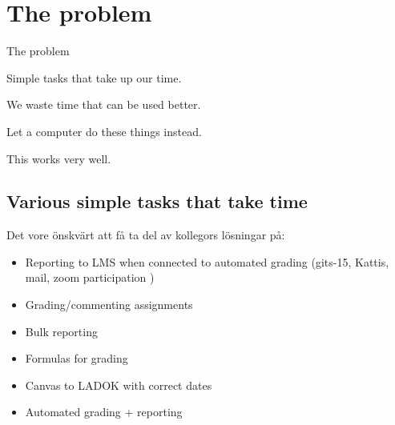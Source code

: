 \mode*

\section{The problem}

\begin{frame}[fragile]
  \begin{block}{The problem}
    \begin{description}
      \item<+>[What's the problem?] Simple tasks that take up our time.
      \item<+>[Why is it a problem?] We waste time that can be used better.
      \item<+>[What's the approach?] Let a computer do these things instead.
      \item<+>[What are the findings?] This works very well.
    \end{description}
  \end{block}
\end{frame}

\subsection{Various simple tasks that take time}

Det vore önskvärt att få ta del av kollegors lösningar på:

\begin{frame}[fragile]\label{WishGradingReporting}
  \begin{example}[Grading]
    \begin{itemize}
      \item {Reporting to LMS when connected to automated grading (\eg gits-15, 
        Kattis, mail, zoom participation \etc)}
      \item {Grading/commenting assignments}
    \end{itemize}
  \end{example}

  \begin{example}[Reporting]
    \begin{itemize}
      \item {Bulk reporting}
      \item {Formulas for grading}
      \item {Canvas to LADOK with correct dates}
      \item {Automated grading + reporting}
    \end{itemize}
  \end{example}
\end{frame}

